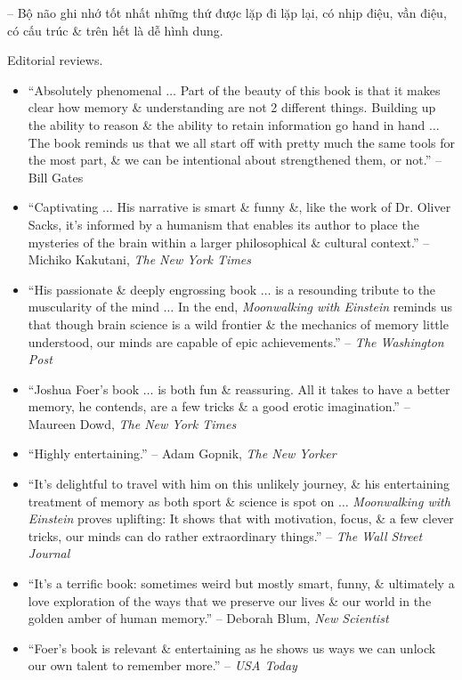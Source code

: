 \documentclass{article}
\begin{document}
\begin{enumerate}
\begin{itemize}
		-- Bộ não ghi nhớ tốt nhất những thứ được lặp đi lặp lại, có nhịp điệu, vần điệu, có cấu trúc \& trên hết là dễ hình dung.
	\end{itemize}
	{\sf Editorial reviews.}
	\begin{itemize}
		\item ``Absolutely phenomenal $\ldots$ Part of the beauty of this book is that it makes clear how memory \& understanding are not 2 different things. Building up the ability to reason \& the ability to retain information go hand in hand $\ldots$ The book reminds us that we all start off with pretty much the same tools for the most part, \& we can be intentional about strengthened them, or not.'' -- {\sc Bill Gates}
		\item ``Captivating $\ldots$ His narrative is smart \& funny \&, like the work of Dr. {\sc Oliver Sacks}, it's informed by a humanism that enables its author to place the mysteries of the brain within a larger philosophical \& cultural context.'' -- {\sc Michiko Kakutani}, {\it The New York Times}
		\item ``His passionate \& deeply engrossing book $\ldots$ is a resounding tribute to the muscularity of the mind $\ldots$ In the end, {\it Moonwalking with {\sc Einstein}} reminds us that though brain science is a wild frontier \& the mechanics of memory little understood, our minds are capable of epic achievements.'' -- {\it The Washington Post}
		\item ``{\sc Joshua Foer}'s book $\ldots$ is both fun \& reassuring. All it takes to have a better memory, he contends, are a few tricks \& a good erotic imagination.'' -- {\sc Maureen Dowd}, {\it The New York Times}
		\item ``Highly entertaining.'' -- {\sc Adam Gopnik}, {\it The New Yorker}
		\item ``It's delightful to travel with him on this unlikely journey, \& his entertaining treatment of memory as both sport \& science is spot on $\ldots$ {\it Moonwalking with {\sc Einstein}} proves uplifting: It shows that with motivation, focus, \& a few clever tricks, our minds can do rather extraordinary things.'' -- {\it The Wall Street Journal}
		\item ``It's a terrific book: sometimes weird but mostly smart, funny, \& ultimately a love exploration of the ways that we preserve our lives \& our world in the golden amber of human memory.'' -- {\sc Deborah Blum}, {\it New Scientist}
		\item ``{\sf Foer}'s book is relevant \& entertaining as he shows us ways we can unlock our own talent to remember more.'' -- {\it USA Today}

\end{itemize}
\end{enumerate}
\end{document}
